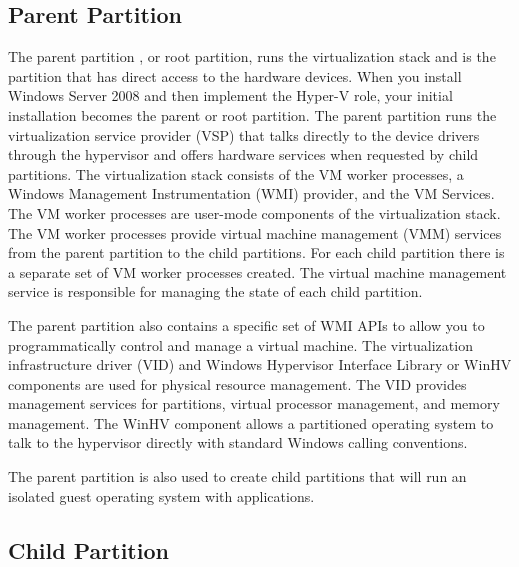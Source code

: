 \vspace{5mm}
\subsection{Parent Partition}
\vspace{5mm}

The parent partition \cite{BOOK:1}, or root partition, runs the virtualization stack and is the partition that has direct access to the hardware devices. When you install Windows Server
2008 and then implement the Hyper-V role, your initial installation becomes the parent or root partition. The parent partition runs the virtualization service provider (VSP) that talks
directly to the device drivers through the hypervisor and offers hardware services when requested by child partitions. The virtualization stack consists of the VM worker processes,
a Windows Management Instrumentation (WMI) provider, and the VM Services. The VM worker processes are user-mode components of the virtualization stack.
The VM worker processes provide virtual machine management (VMM) services from the parent partition to the child partitions. For each child partition there is a separate set of VM worker processes created. The virtual machine management service is responsible for managing the state of each child partition.

\vspace{5mm}

The parent partition also contains a specific set of WMI APIs to allow you to programmatically control and manage a virtual machine. The virtualization infrastructure driver
(VID) and Windows Hypervisor Interface Library or WinHV components are used for physical resource management. The VID provides management services for partitions, virtual processor management, and memory management. The WinHV component allows a partitioned operating system to talk to the hypervisor directly with standard Windows calling conventions.

\vspace{5mm}

The parent partition is also used to create child partitions that will run an isolated guest operating system with applications.

\vspace{5mm}
\subsection{Child Partition}
\vspace{5mm}

